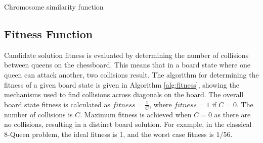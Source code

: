 \documentclass[conference]{IEEEtran}
\begin{document}
\begin{algorithm}
  \SetAlgoLined
  \DontPrintSemicolon
  
\caption{Chromosome similarity function}
\label{alg:similarity}
\end{algorithm}

\subsection{Fitness Function}
Candidate solution fitness is evaluated by determining the number of collisions between queens on the chessboard. This means that in a board state where one queen can attack another, two collisions result. The algorithm for determining the fitness of a given board state is given in Algorithm \ref{alg:fitness}, showing the mechanisms used to find collisions across diagonals on the board. The overall board state fitness is calculated as $fitness = \frac{1}{C}$, where $fitness = 1$ if $C = 0$. The number of collisions is $C$. Maximum fitness is achieved when $C = 0$ as there are no collisions, resulting in a distinct board solution. For example, in the classical 8-Queen problem, the ideal fitness is 1, and the worst case fitness is $1/56$.
 
\end{document}

